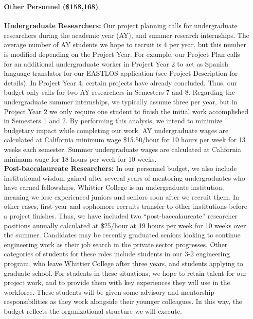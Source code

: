 \documentclass[11pt]{amsart}
\begin{document}
\noindent
\textbf{Other Personnel (\$158,168)} \\ \\
\textbf{Undergraduate Researchers:} Our project planning calls for undergraduate researchers during the academic year (AY), and summer research internships. The average number of AY students we hope to recruit is 4 per year, but this number is modified depending on the Project Year. For example, our Project Plan calls for an additional undergraduate worker in Project Year 2 to act as Spanish language translator for our EASTLOS application (see Project Description for details). In Project Year 4, certain projects have already concluded. Thus, our budget only calls for two AY researchers in Semesters 7 and 8. Regarding the undergraduate summer internships, we typically assume three per year, but in Project Year 2 we only require one student to finish the initial work accomplished in Semesters 1 and 2. By performing this analysis, we intend to minimize budgetary impact while completing our work. AY undergraduate wages are calculated at California minimum wage \$15.50/hour for 10 hours per week for 13 weeks each semester. Summer undergraduate wages are calculated at California minimum wage for 18 hours per week for 10 weeks. \\

\noindent
\textbf{Post-baccalaureate Researchers:} In our personnel budget, we also include institutional wisdom gained after several years of mentoring undergraduates who have earned fellowships. Whittier College is an undergraduate institution, meaning we lose experienced juniors and seniors soon after we recruit them. In other cases, first-year and sophomore recruits transfer to other institutions before a project finishes. Thus, we have included two “post-baccalaureate” researcher positions annually calculated at \$25/hour at 19 hours per week for 10 weeks over the summer. Candidates may be recently graduated seniors looking to continue engineering work as their job search in the private sector progresses. Other categories of students for these roles include students in our 3-2 engineering program, who leave Whittier College after three years, and students applying to graduate school. For students in these situations, we hope to retain talent for our project work, and to provide them with key experiences they will use in the workforce. These students will be given some advisory and mentorship responsibilities as they work alongside their younger colleagues. In this way, the budget reflects the organizational structure we will execute. \\
\end{document}
